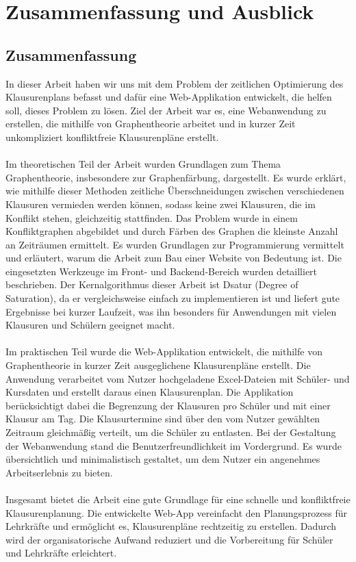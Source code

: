 \newpage
\section{Zusammenfassung und Ausblick}
\subsection{Zusammenfassung}
In dieser Arbeit haben wir uns mit dem Problem der zeitlichen Optimierung des Klausurenplans befasst und dafür eine Web-Applikation entwickelt, die helfen soll, dieses Problem zu lösen. Ziel der Arbeit war es, eine Webanwendung zu erstellen, die mithilfe von Graphentheorie arbeitet und in kurzer Zeit unkompliziert konfliktfreie Klausurenpläne erstellt.\\\\
Im theoretischen Teil der Arbeit wurden Grundlagen zum Thema Graphentheorie, insbesondere zur Graphenfärbung, dargestellt. Es wurde erklärt, wie mithilfe dieser Methoden zeitliche Überschneidungen zwischen verschiedenen Klausuren vermieden werden können, sodass keine zwei Klausuren, die im Konflikt stehen, gleichzeitig stattfinden. Das Problem wurde in einem Konfliktgraphen abgebildet und durch Färben des Graphen die kleinste Anzahl an Zeiträumen ermittelt. Es wurden Grundlagen zur Programmierung vermittelt und erläutert, warum die Arbeit zum Bau einer Website von Bedeutung ist. Die eingesetzten Werkzeuge im Front- und Backend-Bereich wurden detailliert beschrieben. Der Kernalgorithmus dieser Arbeit ist Dsatur (Degree of Saturation), da er vergleichsweise einfach zu implementieren ist und liefert gute Ergebnisse bei kurzer Laufzeit, was ihn besonders für Anwendungen mit vielen Klausuren und Schülern geeignet macht.\\\\
Im praktischen Teil wurde die Web-Applikation entwickelt, die mithilfe von Graphentheorie in kurzer Zeit ausgeglichene Klausurenpläne erstellt. Die Anwendung verarbeitet vom Nutzer hochgeladene Excel-Dateien mit Schüler- und Kursdaten und erstellt daraus einen Klausurenplan. Die Applikation berücksichtigt dabei die Begrenzung der Klausuren pro Schüler und mit einer Klausur am Tag. Die Klausurtermine sind über den vom Nutzer gewählten Zeitraum gleichmäßig verteilt, um die Schüler zu entlasten. Bei der Gestaltung der Webanwendung stand die Benutzerfreundlichkeit im Vordergrund. Es wurde übersichtlich und minimalistisch gestaltet, um dem Nutzer ein angenehmes Arbeitserlebnis zu bieten.\\\\
Insgesamt bietet die Arbeit eine gute Grundlage für eine schnelle und konfliktfreie Klausurenplanung. Die entwickelte Web-App vereinfacht den Planungsprozess für Lehrkräfte und ermöglicht es, Klausurenpläne rechtzeitig zu erstellen. Dadurch wird der organisatorische Aufwand reduziert und die Vorbereitung für Schüler und Lehrkräfte erleichtert.
